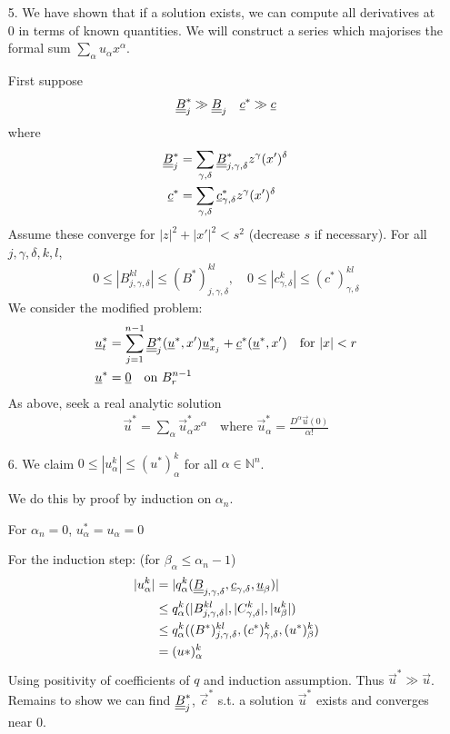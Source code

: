 \documentclass[12pt,a4paper]{report}
\newenvironment{proof}
{\begin{changemargin}{1cm}{0.5cm} 
	}%
	{\end{changemargin}
}
\begin{document}
\begin{proof}
\begin{itemize}
\item[5.] We have shown that if a solution exists, we can compute all derivatives at $0$ in terms of known quantities. We will construct a series which majorises the formal sum $\sum_{\alpha} u_{\alpha}x^{\alpha}$.

\quad First suppose 
\begin{align*}
\underline{\underline{B}}_j^{*} \gg \underline{\underline{B}}_j \quad \underline{c}^* \gg \underline{c}
\end{align*}
where
\begin{align*}
\underline{\underline{B}}_j^{*} &= \sum_{\gamma, \delta} \underline{\underline{B}}_{j,\gamma,\delta}^{*} z^{\gamma} (x')^{\delta} \\
\underline{c}^* &= \sum_{\gamma, \delta} \underline{c}_{\gamma,\delta}^{*} z^{\gamma} (x')^{\delta}
\end{align*}
Assume these converge for $|z|^2 + |x'|^2 <s^2$ (decrease $s$ if necessary). For all $j,\gamma, \delta, k,l$,
\begin{align*}
0\leq |B^{kl}_{j,\gamma,\delta}| \leq (B^*)^{kl}_{j,\gamma,\delta}, \quad 0\leq |c^k_{\gamma, \delta} | \leq (c^*)^{kl}_{\gamma, \delta}
\end{align*}
We consider the modified problem:
\begin{align*}
\underline{u}^*_t &= \sum_{j=1}^{n-1} \underline{\underline{B}}^*_j (\underline{u}^*, x') \underline{u}^*_{x_j} + \underline{c}^*(\underline{u}^*,x') \quad \text{for } |x| <r \\
\underline{u}^* &= \underline{0} \quad \text{on } B_r^{n-1}
\end{align*}
As above, seek a real analytic solution
\begin{align*}
\vec{u}^* = \sum_{\alpha} \vec{u}^*_{\alpha} x^{\alpha} \quad \text{where } \vec{u}^*_{\alpha} = \frac{D^{\alpha}\vec{u}(0)}{\alpha !}
\end{align*}

\item[6.] We claim $0\leq |u_{\alpha}^k| \leq (u^*)^{k}_{\alpha}$ for all $\alpha \in \mathbb{N}^n$.

We do this by proof by induction on $\alpha_n$.

For $\alpha_n =0$, $u_{\alpha}^* = u_{\alpha} =0$

For the induction step: (for $\beta_{\alpha} \leq \alpha_n -1$)
\begin{align*}
|u_{\alpha}^k| &= |q_{\alpha}^k(\underline{\underline{B}}_{j,\gamma,\delta}, \underline{c}_{\gamma,\delta},\underline{u}_{\beta})| \\
&\leq q_{\alpha}^k ( |B_{j,\gamma,\delta}^{kl}|,|C_{\gamma,\delta}^k|,|u^k_{\beta}|) \\
&\leq q_{\alpha}^k ((B^*)^{kl}_{j,\gamma,\delta},(c^*)^{k}_{\gamma,\delta},(u^*)^{k}_{\beta}) \\
&= (u*)^{k}_{\alpha}
\end{align*}
Using positivity of coefficients of $q$ and induction assumption. Thus $\vec{u}^* \gg \vec{u}$. Remains to show we can find $\underline{\underline{B}}_{j}^*$, $\vec{c}^*$ s.t. a solution $\vec{u}^*$ exists and converges near 0.
\end{itemize}
\end{proof}
\end{document}
